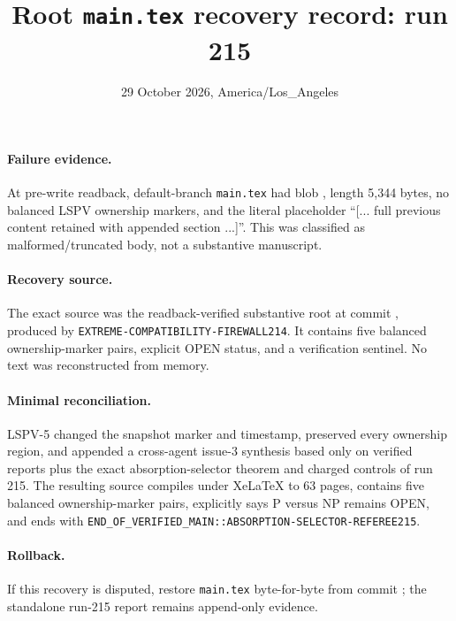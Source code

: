 \documentclass[11pt]{article}
\title{Root \texttt{main.tex} recovery record: run 215}
\date{29 October 2026, America/Los\_Angeles}
\begin{document}
\maketitle
\paragraph{Failure evidence.}
At pre-write readback, default-branch \texttt{main.tex} had blob
, length 5,344 bytes, no balanced LSPV ownership markers, and the literal placeholder ``[... full previous content retained with appended section ...]''.  This was classified as malformed/truncated body, not a substantive manuscript.

\paragraph{Recovery source.}
The exact source was the readback-verified substantive root at commit
, produced by
\texttt{EXTREME-COMPATIBILITY-FIREWALL214}.  It contains five balanced ownership-marker pairs, explicit OPEN status, and a verification sentinel.  No text was reconstructed from memory.

\paragraph{Minimal reconciliation.}
LSPV-5 changed the snapshot marker and timestamp, preserved every ownership region, and appended a cross-agent issue-3 synthesis based only on verified reports plus the exact absorption-selector theorem and charged controls of run 215.  The resulting source compiles under XeLaTeX to 63 pages, contains five balanced ownership-marker pairs, explicitly says P versus NP remains OPEN, and ends with
\texttt{END\_OF\_VERIFIED\_MAIN::ABSORPTION-SELECTOR-REFEREE215}.

\paragraph{Rollback.}
If this recovery is disputed, restore \texttt{main.tex} byte-for-byte from commit
; the standalone run-215 report remains append-only evidence.

\end{document}
